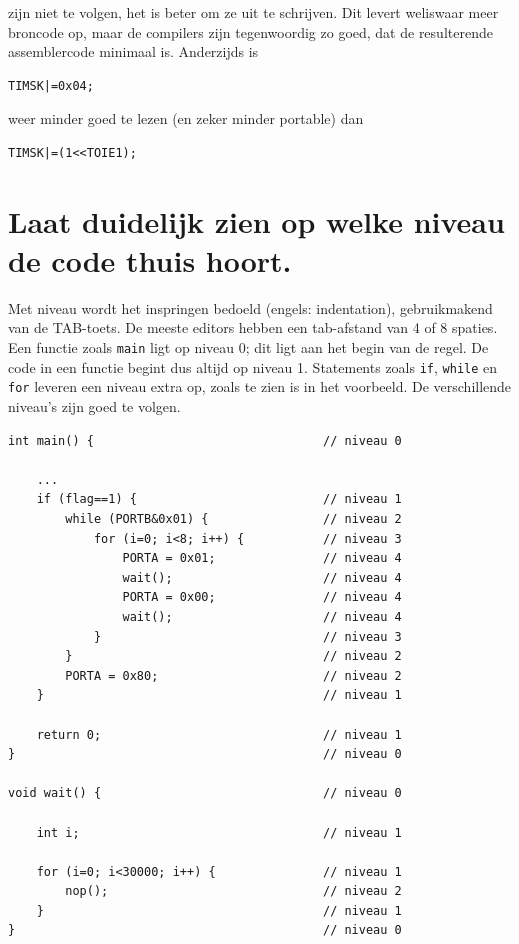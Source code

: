 \documentclass[12pt,a4paper,final,oneside,fleqn]{article}
\begin{document}
\noindent
zijn niet te volgen, het is beter om ze uit te schrijven. Dit levert weliswaar
meer broncode op, maar de compilers zijn tegenwoordig zo goed, dat de resulterende
assemblercode minimaal is. Anderzijds is

\begin{lstlisting}[style=nonumbers,belowcaptionskip=-12pt]
TIMSK|=0x04;
\end{lstlisting}

\noindent
weer minder goed te lezen (en zeker minder portable) dan

\begin{lstlisting}[style=nonumbers,belowcaptionskip=-12pt]
TIMSK|=(1<<TOIE1);
\end{lstlisting}

\section{Laat duidelijk zien op welke niveau de code thuis hoort.}
Met niveau wordt het inspringen bedoeld (engels: indentation), gebruikmakend van
de TAB-toets. De meeste editors hebben een tab-afstand van 4 of 8 spaties. Een
functie zoals \texttt{main} ligt op niveau 0; dit ligt aan het begin van de regel.
De code in een functie begint dus altijd op niveau 1. Statements zoals \texttt{if},
\texttt{while} en \texttt{for} leveren een niveau extra op, zoals te zien is in het
voorbeeld. De verschillende niveau's zijn goed te volgen.

\begin{lstlisting}[style=numbers,caption=Voorbeeld van code met inspringen]
int main() {                                // niveau 0

	...
	if (flag==1) {                          // niveau 1
		while (PORTB&0x01) {                // niveau 2
			for (i=0; i<8; i++) {           // niveau 3
				PORTA = 0x01;               // niveau 4
				wait();                     // niveau 4
				PORTA = 0x00;               // niveau 4
				wait();                     // niveau 4
			}                               // niveau 3
		}                                   // niveau 2
		PORTA = 0x80;                       // niveau 2
	}                                       // niveau 1

	return 0;                               // niveau 1
}                                           // niveau 0

void wait() {                               // niveau 0

	int i;                                  // niveau 1

	for (i=0; i<30000; i++) {               // niveau 1
		nop();                              // niveau 2
	}                                       // niveau 1
}                                           // niveau 0
\end{lstlisting}
\end{document}
